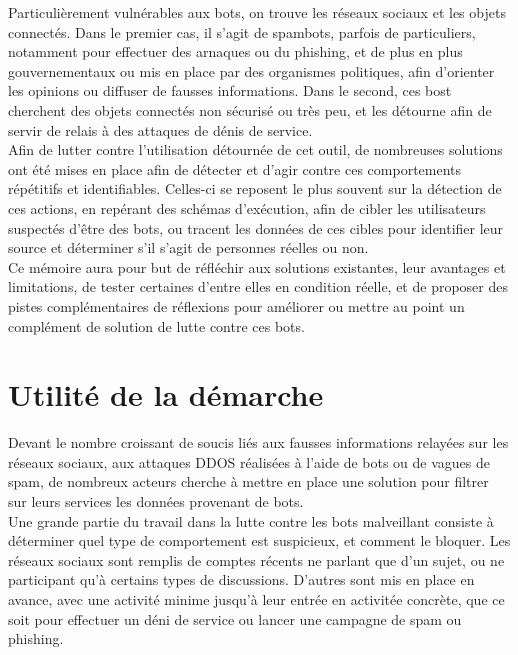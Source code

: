 \documentclass[12pt,a4paper,oldfontcommands]{memoir}
\begin{document}
Particulièrement vulnérables aux bots, on trouve les réseaux sociaux et les objets connectés. Dans le premier cas, il s'agit de spambots, parfois de particuliers, notamment pour effectuer des arnaques ou du phishing, et de plus en plus gouvernementaux ou mis en place par des organismes politiques, afin d'orienter les opinions ou diffuser de fausses informations. Dans le second, ces bost cherchent des objets connectés non sécurisé ou très peu, et les détourne afin de servir de relais à des attaques de dénis de service.\\

Afin de lutter contre l'utilisation détournée de cet outil, de nombreuses solutions ont été mises en place afin de détecter et d'agir contre ces comportements répétitifs et identifiables. Celles-ci se reposent le plus souvent sur la détection de ces actions, en repérant des schémas d'exécution, afin de cibler les utilisateurs suspectés d'être des bots, ou tracent les données de ces cibles pour identifier leur source et déterminer s'il s'agit de personnes réelles ou non. \\

Ce mémoire aura pour but de réfléchir aux solutions existantes, leur avantages et limitations, de tester certaines d'entre elles en condition réelle, et de proposer des pistes complémentaires de réflexions pour améliorer ou mettre au point un complément de solution de lutte contre ces bots.\\

\section*{Utilité de la démarche}

Devant le nombre croissant de soucis liés aux fausses informations relayées sur les réseaux sociaux, aux attaques DDOS réalisées à l'aide de bots ou de vagues de spam, de nombreux acteurs cherche à mettre en place une solution pour filtrer sur leurs services les données provenant de bots. \\

Une grande partie du travail dans la lutte contre les bots malveillant consiste à déterminer quel type de comportement est suspicieux, et comment le bloquer. Les réseaux sociaux sont remplis de comptes récents ne parlant que d'un sujet, ou ne participant qu'à certains types de discussions. D'autres sont mis en place en avance, avec une activité minime jusqu'à leur entrée en activitée concrète, que ce soit pour effectuer un déni de service ou lancer une campagne de spam ou phishing. \\
\end{document}
